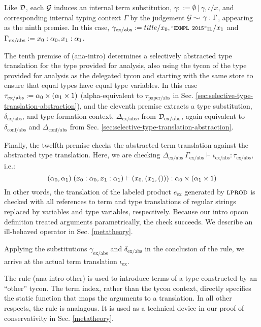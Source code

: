 \documentclass[10pt,preprint]{sigplanconf}
\begin{document}
Like $\mathcal{D}$, each $\mathcal{G}$ induces an internal term substitution,  $\gamma ::= \emptyset ~|~ \gamma, \iota/x$, and corresponding internal typing context $\Gamma$ by the judgement $\mathcal{G} \leadsto \gamma : \Gamma$, appearing as the ninth premise. In this case, $\small
\gamma_\text{ex/abs} := title/x_0, \texttt{"EXMPL 2015"}_\text{IL}/x_1$ and $\small\Gamma_\text{ex/abs} := x_0 : \alpha_0, x_1 : \alpha_1$. 

The tenth premise of (ana-intro) determines a selectively abstracted type translation for the type provided for analysis, also using the tycon of the type provided for analysis as the delegated tycon and starting with the same store to ensure that equal types have equal type variables. In this case $\small\tau_\text{ex/abs} := \alpha_0 \times (\alpha_1 \times \kunit)$ (alpha-equivalent to $\tau_\text{paper/abs}$ in Sec. \ref{sec:selective-type-translation-abstraction}), and the eleventh premise extracts a type substitution, $\delta_\text{ex/abs}$, and type formation context, $\Delta_\text{ex/abs}$, from $\mathcal{D}_\text{ex/abs}$, again equivalent to $\delta_\text{conf/abs}$ and $\Delta_\text{conf/abs}$ from Sec. \ref{sec:selective-type-translation-abstraction}. 

Finally, the twelfth premise checks the abstracted term translation against the abstracted type translation. Here, we are checking $\Delta_\text{ex/abs}~\Gamma_\text{ex/abs} \vdash \iota_\text{ex/abs} : \tau_\text{ex/abs}$, i.e.: 
\[\small(\alpha_0, \alpha_1)~(x_0 : \alpha_0, x_1 : \alpha_1) \vdash (x_0, (x_1, ())) : \alpha_0 \times (\alpha_1 \times \kunit)\]
In other words, the translation of the labeled product $e_\text{ex}$ generated by $\textsc{lprod}$ is checked with all references to term and type translations of regular strings replaced by variables and type variables, respectively. Because our intro opcon definition treated arguments parametrically, the check succeeds. We  describe  an ill-behaved operator in Sec. \ref{metatheory}.

Applying the substitutions $\gamma_\text{ex/abs}$ and $\delta_\text{ex/abs}$ in the conclusion of the rule, we arrive at the actual term translation $\iota_\text{ex}$.

The rule (ana-intro-other) is used to introduce terms of a type constructed by an ``other'' tycon. The term index, rather than the tycon context, directly specifies the static function that maps the arguments to a translation. In all other respects, the rule is analagous. It is used as a technical device in our proof of conservativity in Sec. \ref{metatheory}.
\end{document}
